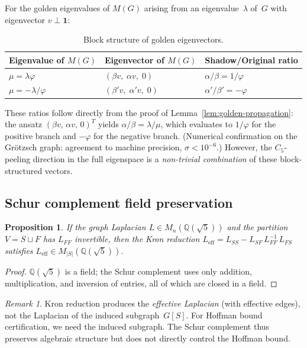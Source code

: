 \documentclass[11pt,a4paper]{amsart}
\theoremstyle{plain}
\newtheorem{proposition}[theorem]{Proposition}
\theoremstyle{definition}
\theoremstyle{remark}
\newtheorem{remark}[theorem]{Remark}
\newcommand{\Q}{\mathbb{Q}}
\newcommand{\vp}{\varphi}
\begin{document}
For the golden eigenvalues of $M(G)$ arising from an eigenvalue~$\lambda$
of~$G$ with eigenvector $v \perp \mathbf{1}$:

\begin{table}[ht]
\centering
\caption{Block structure of golden eigenvectors.}
\label{tab:block}
\begin{tabular}{lll}
\toprule
Eigenvalue of $M(G)$ & Eigenvector of $M(G)$ & Shadow/Original ratio \\
\midrule
$\mu = \lambda\vp$        & $(\beta v,\;\alpha v,\;0)$   & $\alpha/\beta = 1/\vp$ \\
$\mu = -\lambda/\vp$      & $(\beta' v,\;\alpha' v,\;0)$ & $\alpha'/\beta' = -\vp$ \\
\bottomrule
\end{tabular}
\end{table}

These ratios follow directly from the proof of
Lemma~\ref{lem:golden-propagation}: the ansatz $(\beta v,\,\alpha v,\,0)^T$ yields
$\alpha/\beta = \lambda/\mu$, which evaluates to $1/\vp$ for the positive
branch and $-\vp$ for the negative branch.  (Numerical confirmation on the
Gr\"otzsch graph: agreement to machine precision, $\sigma < 10^{-6}$.)
However, the $C_5$-peeling direction in the full eigenspace is a
\emph{non-trivial combination} of these block-structured vectors.

\subsection{Schur complement field preservation}

\begin{proposition}\label{prop:schur}
If the graph Laplacian $L \in M_n(\Q(\sqrt{5}))$ and the partition $V = S \sqcup F$
has $L_{FF}$ invertible, then the Kron reduction
$L_{\mathrm{eff}} = L_{SS} - L_{SF}\,L_{FF}^{-1}\,L_{FS}$ satisfies
$L_{\mathrm{eff}} \in M_{|S|}(\Q(\sqrt{5}))$.
\end{proposition}

\begin{proof}
$\Q(\sqrt{5})$ is a field; the Schur complement uses only addition,
multiplication, and inversion of entries, all of which are closed in a field.
\end{proof}

\begin{remark}\label{rem:schur-caveat}
Kron reduction produces the \emph{effective Laplacian} (with effective edges),
not the Laplacian of the induced subgraph~$G[S]$.  For Hoffman bound
certification, we need the induced subgraph.  The Schur complement thus
preserves algebraic structure but does not directly control the Hoffman bound.
\end{remark}
\end{document}
